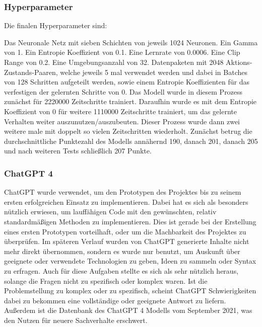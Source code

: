 \subsubsection{Hyperparameter}
Die finalen Hyperparameter sind:

Das Neuronale Netz mit sieben Schichten von jeweils 1024 Neuronen. Ein Gamma von 1. Ein Entropie Koeffizient von 0.1. Eine Lernrate von 0.0006. Eine Clip Range von 0.2. Eine Umgebungsanzahl von 32. Datenpaketen mit 2048 Aktions-Zustands-Paaren, welche jeweils 5 mal verwendet werden und dabei in Batches von 128 Schritten aufgeteilt werden, sowie einem Entropie Koeffizienten für das verfestigen der gelernten Schritte von 0. Das Modell wurde in diesem Prozess zunächst für 2220000 Zeitschritte trainiert. Daraufhin wurde es mit dem Entropie Koeffizient von 0 für weitere 1110000 Zeitschritte trainiert, um das gelernte Verhalten weiter auszunutzen/auszubeuten. Dieser Prozess wurde dann zwei weitere male mit doppelt so vielen Zeitschritten wiederholt. Zunächst betrug die durchschnittliche Punktezahl des Modells annähernd 190, danach 201, danach 205 und nach weiteren Tests schließlich 207 Punkte.

\subsubsection{ChatGPT 4}
ChatGPT wurde verwendet, um den Prototypen des Projektes bis zu seinem ersten erfolgreichen Einsatz zu implementieren. Dabei hat es sich als besonders nützlich erwiesen, um lauffähigen Code mit den gewünschten, relativ standardmäßigen Methoden zu implementieren. Dies ist gerade bei der Erstellung eines ersten Prototypen vorteilhaft, oder um die Machbarkeit des Projektes zu überprüfen. Im späteren Verlauf wurden von ChatGPT generierte Inhalte nicht mehr direkt übernommen, sondern es wurde nur benutzt, um Auskunft über geeignete oder verwendete Technologien zu geben, Ideen zu sammeln oder Syntax zu erfragen. Auch für diese Aufgaben stellte es sich als sehr nützlich heraus, solange die Fragen nicht zu spezifisch oder komplex waren. Ist die Problemstellung zu komplex oder zu spezifisch, scheint ChatGPT Schwierigkeiten dabei zu bekommen eine vollständige oder geeignete Antwort zu liefern. Außerdem ist die Datenbank des ChatGPT 4 Modells vom September 2021, was den Nutzen für neuere Sachverhalte erschwert.